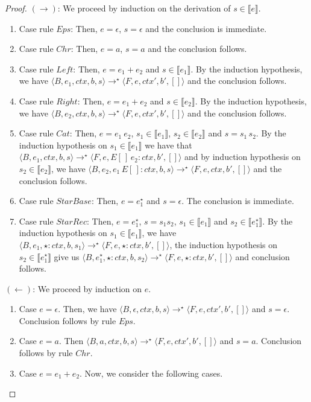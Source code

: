 \documentclass[oneside,12pt]{scrbook}
\theoremstyle{definition}
\newcommand{\sembrackets}[1]{\ensuremath{\llbracket #1 \rrbracket}}
\newcommand{\conf}[1]{\ensuremath{\langle #1 \rangle}}
\theoremstyle{plain}
\theoremstyle{definition}
\begin{document}
\begin{proof}
	$(\to)$: We proceed by induction on the derivation of $s\in\sembrackets{e}$.
	\begin{enumerate}
		\item Case rule $Eps$: Then, $e = \epsilon$, $s = \epsilon$ and the conclusion is immediate.
		\item Case rule $Chr$: Then, $e = a$, $s = a$ and the conclusion follows.
		\item Case rule $Left$: Then, $e = e_1 + e_2$ and $s \in\sembrackets{e_1}$. By the induction hypothesis,
		we have $\conf{B,e_1,ctx,b,s}\to^\star\conf{F,e,ctx',b',[]}$ and the conclusion follows.
		\item Case rule $Right$: Then, $e = e_1 + e_2$ and $s \in\sembrackets{e_2}$. By the induction hypothesis,
		we have $\conf{B,e_2,ctx,b,s}\to^\star\conf{F,e,ctx',b',[]}$ and the conclusion follows.
		\item Case rule $Cat$: Then, $e = e_1\:e_2$, $s_1 \in\sembrackets{e_1}$, $s_2\in\sembrackets{e_2}$ and
		$s = s_1\,s_2$. By the induction hypothesis on $s_1 \in\sembrackets{e_1}$ we have that
		$\conf{B,e_1,ctx,b,s}\to^\star\conf{F,e,E[\,]\,e_2 : ctx,b',[]}$ and by
		induction hypothesis on $s_2\in\sembrackets{e_2}$, we have
		$\conf{B,e_2,e_1\,E[\,]:ctx,b,s}\to^\star\conf{F,e,ctx,b',[]}$ and the conclusion follows.
		\item Case rule $StarBase$: Then, $e = e_1^\star$ and $s = \epsilon$. The conclusion is immediate.
		\item Case rule $StarRec$: Then, $e = e_1^\star$, $s = s_1s_2$, $s_1 \in \sembrackets{e_1}$ and
		$s_2\in\sembrackets{e_1^\star}$. By the induction hypothesis on  $s_1 \in \sembrackets{e_1}$, we
		have $\conf{B,e_1,\star : ctx,b,s_1}\to^\star\conf{F,e, \star: ctx,b',[]}$, the induction
		hypothesis on $s_2\in\sembrackets{e_1^\star}$ give us $\conf{B,e_1^\star,\star : ctx,b,s_2}\to^\star\conf{F,e, \star: ctx,b',[]}$
		and conclusion follows.
	\end{enumerate}
	$(\leftarrow)$: We proceed by induction on $e$.
	\begin{enumerate}
		\item Case $e = \epsilon$. Then, we have
		$\conf{B,\epsilon,ctx,b,s}\to^\star\conf{F,e,ctx',b',[]}$ and $s = \epsilon$. Conclusion follows by rule $Eps$.
		\item Case $e = a$. Then
		$\conf{B,a,ctx,b,s}\to^\star\conf{F,e,ctx',b',[]}$ and $s = a$. Conclusion follows by rule $Chr$.
		\item Case $e = e_1 + e_2$. Now, we consider the following cases.

\end{enumerate}
\end{proof}
\end{document}
